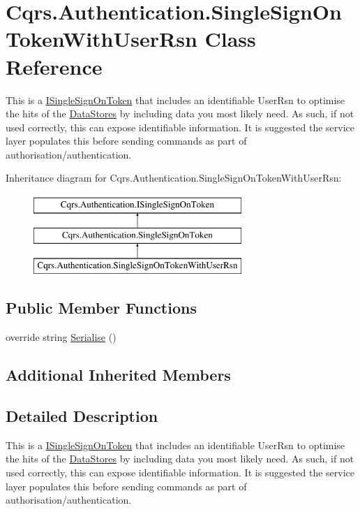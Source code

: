 \hypertarget{classCqrs_1_1Authentication_1_1SingleSignOnTokenWithUserRsn}{}\section{Cqrs.\+Authentication.\+Single\+Sign\+On\+Token\+With\+User\+Rsn Class Reference}
\label{classCqrs_1_1Authentication_1_1SingleSignOnTokenWithUserRsn}


This is a \hyperlink{interfaceCqrs_1_1Authentication_1_1ISingleSignOnToken}{I\+Single\+Sign\+On\+Token} that includes an identifiable User\+Rsn to optimise the hits of the \hyperlink{}{Data\+Stores} by including data you most likely need. As such, if not used correctly, this can expose identifiable information. It is suggested the service layer populates this before sending commands as part of authorisation/authentication.  


Inheritance diagram for Cqrs.\+Authentication.\+Single\+Sign\+On\+Token\+With\+User\+Rsn\+:\begin{figure}[H]
\begin{center}
\leavevmode
\includegraphics[height=3.000000cm]{classCqrs_1_1Authentication_1_1SingleSignOnTokenWithUserRsn}
\end{center}
\end{figure}
\subsection*{Public Member Functions}
\begin{DoxyCompactItemize}
\item 
override string \hyperlink{classCqrs_1_1Authentication_1_1SingleSignOnTokenWithUserRsn_a8103820e6352c10b3990fb027dd9b5ae}{Serialise} ()
\end{DoxyCompactItemize}
\subsection*{Additional Inherited Members}


\subsection{Detailed Description}
This is a \hyperlink{interfaceCqrs_1_1Authentication_1_1ISingleSignOnToken}{I\+Single\+Sign\+On\+Token} that includes an identifiable User\+Rsn to optimise the hits of the \hyperlink{}{Data\+Stores} by including data you most likely need. As such, if not used correctly, this can expose identifiable information. It is suggested the service layer populates this before sending commands as part of authorisation/authentication. 



